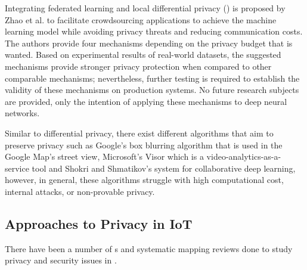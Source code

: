 Integrating federated learning and local differential privacy (\hyperlink{\acronym}{\acronym}) is proposed
by Zhao et al. \cite{zhao2020local} to facilitate crowdsourcing applications to
achieve the machine learning model while avoiding privacy threats and reducing
communication costs. The authors provide four mechanisms depending on the
privacy budget that is wanted. Based on experimental results of real-world
datasets, the suggested mechanisms provide stronger privacy protection when
compared to other comparable mechanisms; nevertheless, further testing is
required to establish the validity of these mechanisms on production systems.
No future research subjects are provided, only the intention of applying
these mechanisms to deep neural networks.

Similar to differential privacy, there exist different algorithms that aim to
preserve privacy such as Google's box blurring algorithm \cite{FromeLarge}
that is used in the Google Map's street view, Microsoft's Visor \cite{poddar2020visor}
which is a video-analytics-as-a-service tool and Shokri and Shmatikov's
\cite{ShokriPrivacy} system for collaborative deep learning, however, in
general, these algorithms struggle with high computational cost, internal
attacks, or non-provable privacy.

\subsection{Approaches to Privacy in IoT}\label{subsection:privacy_in_iot_approaches}

There have been a number of \hyperlink{\acronym}{\acronym}s \cite{Gupta2022Privacy, Kuhtreiber2022survey, sicari2015security, LinSurvey, yang2022overview, zubaydi2023leveraging}
and systematic mapping reviews \cite{porras2018security, ahmed2019aspects}
done to study privacy and security issues in \hyperlink{\acronym}{\acronym}.

